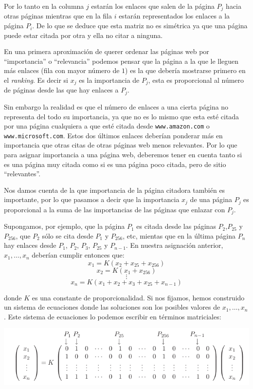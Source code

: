 \documentclass[size=a4, parskip=half, titlepage=false, toc=flat, toc=bib, 12pt]{scrartcl}
\theoremstyle{theorem-style}
\theoremstyle{definition-style}
\theoremstyle{remark-style}
\theoremstyle{example-style}
\theoremstyle{definition-style}
\theoremstyle{remark-style}
\begin{document}
Por lo tanto en la columna $j$ estarán los enlaces que salen de la página $P_j$ hacia otras páginas
mientras que en la fila $i$ estarán representados los enlaces a la página $P_i$. De lo que se deduce que esta matriz
no es simétrica ya que una página puede estar citada por otra y ella no citar a ninguna.

En una primera aproximación de querer ordenar las páginas web por ``importancia'' o ``relevancia'' podemos
pensar que la página a la que le lleguen más enlaces (fila con mayor número de $1$) es la que debería
mostrarse primero en el \textit{ranking}. Es decir si $x_j$ es la importancia de $P_j$, esta es proporcional
al número de páginas desde las que hay enlaces a $P_j$.

Sin embargo la realidad es que el número de enlaces a una cierta página no representa del todo su importancia,
ya que no es lo mismo que esta esté citada por una página cualquiera a que esté citada desde \verb|www.amazon.com| o
\verb|www.microsoft.com|. Estos dos últimos enlaces deberían ponderar más en importancia que otras citas de
otras páginas web menos relevantes. Por lo que para asignar importancia a una página web, deberemos tener
en cuenta tanto si es una página muy citada como si es una página poco citada, pero de sitio ``relevantes''.

Nos damos cuenta de la que importancia de la página citadora también es importante, por lo que pasamos a decir
que la importancia $x_j$ de una página $P_j$ es proporcional a la suma de las importancias de las páginas que enlazar
con $P_j$.

Supongamos, por ejemplo, que la página $P_1$ es citada desde las páginas $P_2$,$P_{25}$ y $P_{256}$,
 que $P_2$ sólo se cita desde $P_1$ y $P_{256}$, etc, mientas que en la última página $P_n$ hay enlaces
 desde $P_1$, $P_2$, $P_3$, $P_{25}$ y $P_{n-1}$. En nuestra asignación anterior, $x_1, \dots , x_n$ deberían
 cumplir entonces que:
 $$ x_1 = K (x_2 + x_{25} + x_{256}) $$
 $$ x_2 = K (x_1 + x_{256}) $$
 $$ \vdots $$
 $$x_n = K (x_1 + x_2 + x_3 + x_25 + x_{n-1}) $$

donde $K$ es una constante de proporcionalidad. Si nos fijamos, hemos construido un sistema de ecuaciones
donde las soluciones son los posibles valores de $x_1, \dots , x_n$. Este sistema de ecuaciones
lo podemos escribir en términos matriciales:

\includegraphics[width=1.0\textwidth]{./img/sde}
\end{document}

